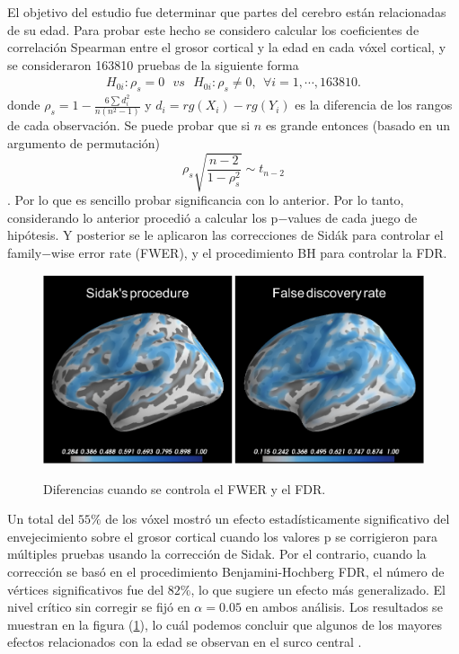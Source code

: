 \documentclass[11pt,letterpaper]{article}
\begin{document}
El objetivo del estudio fue determinar que partes del cerebro están relacionadas de su edad. Para probar este hecho se considero calcular los coeficientes de correlación Spearman  entre el grosor cortical y la edad en cada vóxel cortical, y se consideraron 163810 pruebas de la siguiente forma
\begin{align*}
H_{0i}: \rho_s =0 \ \ \ vs \ \ \ H_{0i}:\rho_s\neq 0, \ \ \forall i=1,\cdots, 163810.
\end{align*}
donde $\rho_s=1-\frac{6\sum d_i^2}{n(n^2-1)}$ y $d_i=rg(X_i)-rg(Y_i)$ es la diferencia de los rangos de cada observación. Se puede probar que si $n$ es grande entonces (basado en un argumento de permutación) 
$$\rho_s\sqrt{\frac{n-2}{1-\rho_s^2}} \sim t_{n-2}$$.
Por lo que es sencillo probar significancia con lo anterior. Por lo tanto, considerando lo anterior procedió a calcular los p$-$values de cada juego de hipótesis. Y posterior se le aplicaron las correcciones de Sidák para controlar el family$-$wise error rate (FWER), y el procedimiento BH para controlar la FDR. 
\begin{figure}[H]
\centering \label{cerebro}
\includegraphics[scale=.5]{neurociencia_FDR_FWER.png}
\caption{Diferencias cuando se controla el FWER y el FDR.}
\end{figure}
Un total del $55\%$ de los vóxel mostró un efecto estadísticamente significativo del envejecimiento sobre el grosor cortical cuando los valores p se corrigieron para múltiples pruebas usando la corrección de Sidak. Por el contrario, cuando la corrección se basó en el procedimiento Benjamini-Hochberg FDR, el número de vértices significativos fue del $82\%$, lo que sugiere un efecto más generalizado. El nivel crítico sin corregir se fijó en $\alpha = 0.05$ en ambos análisis.
Los resultados se muestran en la figura (\ref{cerebro}), lo cuál podemos concluir que algunos de los mayores efectos relacionados con la edad se observan en el surco central \cite{git_cerebro_2}.
\end{document}
